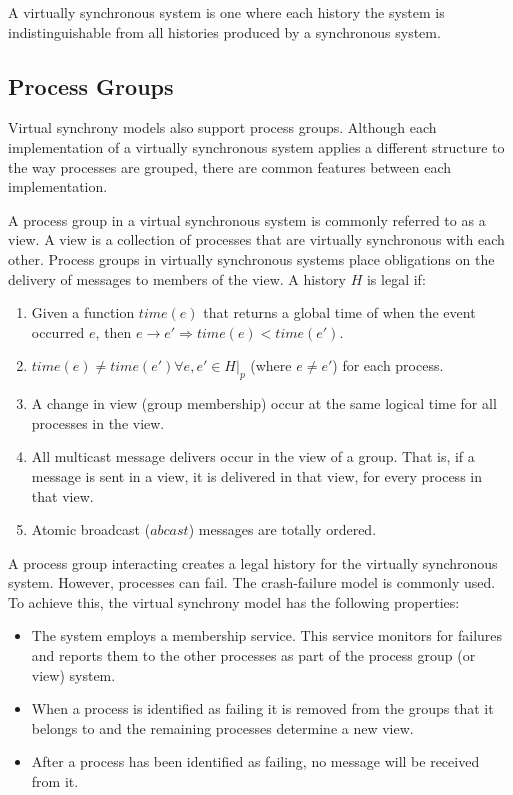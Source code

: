 A virtually synchronous system is one where each history the system is
indistinguishable from all histories produced by a synchronous system. \cite[p~.104]{ISISTOOLKIT}

\subsection{Process Groups}

Virtual synchrony models also support process groups. Although each
implementation of a virtually synchronous system applies a different structure
to the way processes are grouped, there are common features between each
implementation.

A process group in a virtual synchronous system is commonly referred to as a
view. A view is a collection of processes that are virtually synchronous
with each other. Process groups in virtually synchronous systems place 
obligations on the delivery of messages to members of the view. A history
$H$ is legal if:

\begin{enumerate}
    \item Given a function $time(e)$ that returns a global time of when the event occurred $e$, then $e \rightarrow e' \Rightarrow time(e) < time(e').$
    \item $time(e) \neq time(e') \forall e, e' \in H|_{p}$ (where $e \neq e'$) for each process.
    \item A change in view (group membership) occur at the same logical time for all processes in the view.
    \item All multicast message delivers occur in the view of a group. That is, if a message is sent in a view, it is delivered in that view, for every process in that view.
    \item Atomic broadcast ($abcast$) messages are totally ordered.
\end{enumerate} \cite[p~.103]{ISISTOOLKIT}

A process group interacting creates a legal history for the virtually
synchronous system. However, processes can fail. The crash-failure model is
commonly used. To achieve this, the virtual synchrony model has the following
properties:

\begin{itemize}
    \item The system employs a membership service. This service monitors for failures and reports them to the other processes as part of the process group (or view) system.
    \item When a process is identified as failing it is removed from the groups that it belongs to and the remaining processes determine a new view.
    \item After a process has been identified as failing, no message will be received from it.
\end{itemize} \cite[p~.102]{ISISTOOLKIT}

